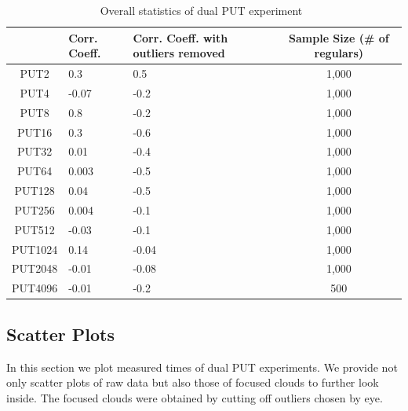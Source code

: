 \documentclass[10pt]{article}
\begin{document}
\begin{table}[h]
\centering
{
\begin{tabular}{|c|p{2cm}|p{2cm}|c|} \hline
 & Corr. Coeff. & Corr. Coeff. with outliers removed & Sample Size  (\# of regulars)\\ \hline
PUT2 & 0.3 & 0.5 & 1,000 \\ \hline
PUT4 & -0.07 & -0.2 & 1,000\\ \hline
PUT8 & 0.8 & -0.2 & 1,000\\ \hline
PUT16 & 0.3 & -0.6 & 1,000\\ \hline
PUT32 & 0.01 & -0.4 & 1,000\\ \hline
PUT64 & 0.003 & -0.5 & 1,000\\ \hline
PUT128 & 0.04 & -0.5 & 1,000\\ \hline
PUT256 & 0.004 & -0.1 & 1,000\\ \hline
PUT512 & -0.03 & -0.1 & 1,000\\ \hline
PUT1024 & 0.14 & -0.04 & 1,000\\ \hline
PUT2048 & -0.01 & -0.08 & 1,000\\ \hline \hline
PUT4096 & -0.01 & -0.2 & 500\\ \hline
  \end{tabular}
  }
 \caption{Overall statistics of dual PUT experiment~\label{fig:corr_dual_put}}
\end{table}

\clearpage
\newpage

\subsection{Scatter Plots}
In this section we plot measured times of dual PUT experiments.
We provide not only scatter plots of raw data but also those of focused clouds to further look inside. 
The focused clouds were obtained by cutting off outliers chosen by eye.
\end{document}
